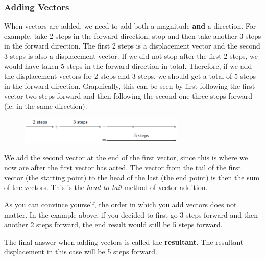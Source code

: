             \subsubsection{ Adding Vectors}
            \nopagebreak
        \label{m38813*id188304}When vectors are added, we need to add both a magnitude \textbf{and} a direction. For example, take 2 steps in the forward direction, stop and then take another 3 steps in the forward direction. The first 2 steps is a displacement vector and the second 3 steps is also a displacement vector. If we did not stop after the first 2 steps, we would have taken 5 steps in the forward direction in total. Therefore, if we add the displacement vectors for 2 steps and 3 steps, we should get a total of 5 steps in the forward direction. Graphically, this can be seen by first following the first vector two steps forward and then following the second one three steps forward (ie. in the same direction):\par 
        \label{m38813*id188318}
    \setcounter{subfigure}{0}
	\begin{figure}[H] %
    \begin{center}
    \label{m38813*id188322!!!underscore!!!media}\label{m38813*id188322!!!underscore!!!printimage}\includegraphics[width=300px]{col11305.imgs/m38813_PG11C1_013.png} %
      \vspace{2pt}
    \vspace{.1in}
    \end{center}
 \end{figure}       
        \par 
        \label{m38813*id188328}We add the second vector at the end of the first vector, since this is where we now are after the first vector has acted. The vector from the tail of the
first vector (the starting point) to the head of the last (the end
point) is then the sum of the vectors. This is the \textsl{head-to-tail} method of vector addition.\par 
        \label{m38813*id188340}As you can convince yourself, the order in which you add vectors does
not matter. In the example above, if you decided to first go 3 steps
forward and then another 2 steps forward, the end result would still be 5
steps forward.\par 
        \label{m38813*id188345}The final answer when adding vectors is called the \textbf{resultant}. The resultant displacement in this case will be 5 steps forward.\par 
